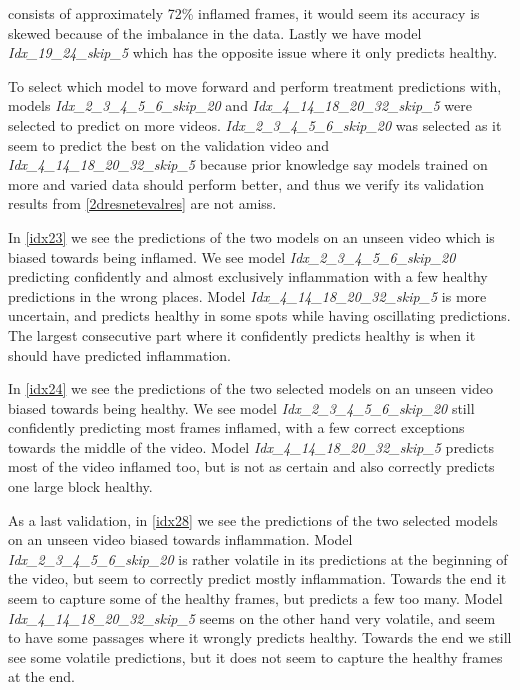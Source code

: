 consists of approximately 72\% inflamed frames, it would seem its accuracy is skewed because of the imbalance in the data. Lastly we have model \textit{Idx\_19\_24\_skip\_5} which has the opposite issue where it only predicts healthy.

To select which model to move forward and perform treatment predictions with, models \textit{Idx\_2\_3\_4\_5\_6\_skip\_20} and \textit{Idx\_4\_14\_18\_20\_32\_skip\_5} were selected to predict on more videos. \textit{Idx\_2\_3\_4\_5\_6\_skip\_20} was selected as it seem to predict the best on the validation video and \textit{Idx\_4\_14\_18\_20\_32\_skip\_5} because prior knowledge say models trained on more and varied data should perform better, and thus we verify its validation results from \autoref{2dresnetevalres} are not amiss.

In \autoref{idx23} we see the predictions of the two models on an unseen video which is biased towards being inflamed. We see model \textit{Idx\_2\_3\_4\_5\_6\_skip\_20} predicting confidently and almost exclusively inflammation with a few healthy predictions in the wrong places. Model \textit{Idx\_4\_14\_18\_20\_32\_skip\_5} is more uncertain, and predicts healthy in some spots while having oscillating predictions. The largest consecutive part where it confidently predicts healthy is when it should have predicted inflammation.

In \autoref{idx24} we see the predictions of the two selected models on an unseen video biased towards being healthy. We see model \textit{Idx\_2\_3\_4\_5\_6\_skip\_20} still confidently predicting most frames inflamed, with a few correct exceptions towards the middle of the video. Model \textit{Idx\_4\_14\_18\_20\_32\_skip\_5} predicts most of the video inflamed too, but is not as certain and also correctly predicts one large block healthy.

As a last validation, in \autoref{idx28} we see the predictions of the two selected models on an unseen video biased towards inflammation. Model \textit{Idx\_2\_3\_4\_5\_6\_skip\_20} is rather volatile in its predictions at the beginning of the video, but seem to correctly predict mostly inflammation. Towards the end it seem to capture some of the healthy frames, but predicts a few too many. Model \textit{Idx\_4\_14\_18\_20\_32\_skip\_5} seems on the other hand very volatile, and seem to have some passages where it wrongly predicts healthy. Towards the end we still see some volatile predictions, but it does not seem to capture the healthy frames at the end.


